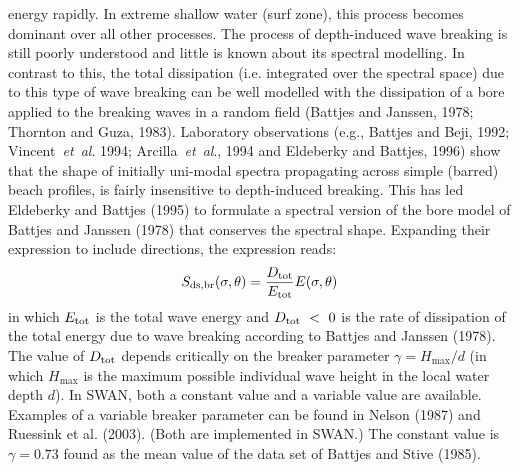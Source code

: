 \documentclass[12pt]{book}
\begin{document}
energy rapidly. In extreme shallow water (surf zone), this process becomes dominant over all other
processes. The process of depth-induced wave breaking is still poorly understood and little is
known about its spectral modelling. In contrast to this, the total dissipation (i.e. integrated
over the spectral space) due to this type of wave breaking can be well modelled with the dissipation
of a bore applied to the breaking waves
in a random field (Battjes and Janssen, 1978; Thornton and Guza, 1983). Laboratory observations (e.g.,
Battjes and Beji, 1992; Vincent~{\it et~al}. 1994; Arcilla~{\it et~al}., 1994 and Eldeberky and Battjes, 1996) show that
the shape of initially uni-modal spectra propagating across simple (barred) beach profiles, is fairly
insensitive to depth-induced breaking. This has led Eldeberky and Battjes (1995) to formulate a spectral
version of the bore model of Battjes and Janssen (1978) that conserves the spectral shape. Expanding
their expression to include directions, the expression reads:
\begin{equation}
  S_{\rm ds,br} (\sigma,\theta) = \frac{D_{\rm tot}}{E_{\rm tot}} E(\sigma,\theta)
  \label{eq2-8}
\end{equation}
in which $E_{\rm tot}$ is the total wave energy and $D_{\rm tot}~<~0$ is the rate of dissipation of
the total energy due to wave breaking according to Battjes and Janssen (1978).
The value of $D_{\rm tot}$ depends critically on the breaker parameter $\gamma = H_{\max}/d$
(in which $H_{\max}$ is the maximum possible individual wave height in the local water depth $d$).
In SWAN, both a constant value and a variable value are available. Examples of a variable breaker parameter
can be found in Nelson (1987) and Ruessink et al. (2003). (Both are implemented in SWAN.)
The constant value is $\gamma=0.73$ found as
the mean value of the data set of Battjes and Stive (1985).
\nocite{Bat78J,Tho83G,Bat92B,Vin94SD,Arc94RC,Eld96B,Eld95B,Mas92K,Elg97GRHG,Che97GE,Nel87,Rue03WS,Bat85S}
\end{document}
